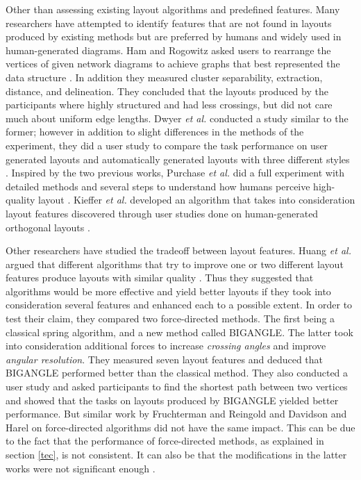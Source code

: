 \documentclass[a4paper,11pt,phdthesis,singlespace,twoside]{cssethesis}
\begin{document}
Other than assessing existing layout algorithms and predefined features. Many researchers have attempted to identify features that are not found in layouts produced by existing methods but are preferred by humans and widely used in human-generated diagrams. Ham and Rogowitz asked users to rearrange the vertices of given network diagrams to achieve graphs that best represented the data structure \cite{ham2008perceptual}. In addition they measured cluster separability, extraction, distance, and delineation. They concluded that the layouts produced by the participants where highly structured and had less crossings, but did not care much about uniform edge lengths. 
Dwyer \emph{et al.} conducted a study similar to the former; however in addition to slight differences in the methods of the experiment, they did a user study to compare the task performance on user generated layouts and automatically generated layouts with three different styles \cite{dwyer2009comparison}. 
Inspired by the two previous works, Purchase \emph{et al.} did a full experiment with detailed methods and several steps to understand how humans perceive high-quality layout \cite{purchase2012graph}. Kieffer \emph{et al.} developed an algorithm that takes into consideration layout features discovered through user studies done on human-generated orthogonal layouts \cite{kieffer2015hola}.

Other researchers have studied the tradeoff between layout features. Huang \emph{et al.} argued that different algorithms that try to improve one or two different layout features produce layouts with similar quality \cite{huang2010improving}. Thus they suggested that algorithms would be more effective and yield better layouts if they took into consideration several features and enhanced each to a possible extent. In order to test their claim, they compared two force-directed methods. The first being a classical spring algorithm, and a new method called BIGANGLE. The latter took into consideration additional forces to increase \emph{crossing angles} and improve \emph{angular resolution}. They measured seven layout features and deduced that BIGANGLE performed better than the classical method. They also conducted a user study and asked participants to find the shortest path between two vertices and showed that the tasks on layouts produced by BIGANGLE yielded better performance. But similar work by Fruchterman and Reingold \cite{fruchterman1991graph} and Davidson and Harel \cite{davidson1996drawing} on force-directed algorithms did not have the same impact. This can be due to the fact that the performance of force-directed methods, as explained in section \ref{tec}, is not consistent. It can also be that the modifications in the latter works were not significant enough \cite{huang2010improving}. 
\end{document}
